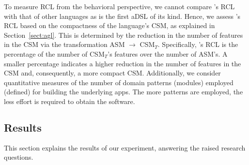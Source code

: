 To measure RCL from the behavioral perspective, we cannot compare \agl's RCL with that of other languages as \agl is the first aDSL of its kind. Hence, we assess \agl's RCL based on the compactness of the language's CSM, as explained in Section~\ref{sect:agl}. This is determined by the reduction in the number of features in the CSM via the transformation ASM $\rightarrow$ CSM$_T$. Specifically, \agl's RCL is the percentage of the number of CSM$_T$'s features over the number of ASM's. A smaller percentage indicates a higher reduction in the number of features in the CSM and, consequently, a more compact CSM. Additionally, we consider quantitative measures of the number of domain patterns (modules) employed (defined) for building the underlying apps. The more patterns are employed, the less effort is required to obtain the software. %

\subsection{Results}
\label{subsect:results} 

This section explains the results of our experiment, answering the raised research questions.

\label{sect:eval-expressiveness}

